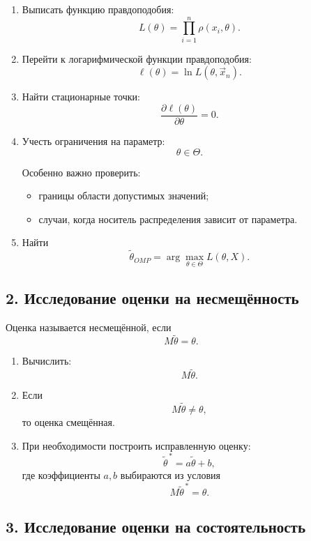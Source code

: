 \documentclass{article}
\begin{document}
\begin{enumerate}
    \item Выписать функцию правдоподобия:
    \[
    L(\theta)=\prod_{i=1}^n \rho(x_i, \theta).
    \]

    \item Перейти к логарифмической функции правдоподобия:
    \[
    \ell(\theta)=\ln L(\theta,\vec{x}_n).
    \]

    \item Найти стационарные точки:
    \[
    \frac{\partial \ell(\theta)}{\partial \theta}=0.
    \]

    \item Учесть ограничения на параметр:
    \[
    \theta \in \Theta.
    \]

    Особенно важно проверить:
    \begin{itemize}
        \item границы области допустимых значений;
        \item случаи, когда носитель распределения зависит от параметра.
    \end{itemize}

    \item Найти
    \[
    \widetilde{\theta}_{OMP}
    =
    \arg\max_{\theta \in \Theta} L(\theta,X).
    \]
\end{enumerate}

\subsection*{2. Исследование оценки на несмещённость}

Оценка называется несмещённой, если
\[
M\widetilde{\theta}=\theta.
\]

\begin{enumerate}
    \item Вычислить:
    \[
    M \widetilde{\theta}.
    \]

    \item Если
    \[
    M \widetilde{\theta}\neq \theta,
    \]
    то оценка смещённая.

    \item При необходимости построить исправленную оценку:
    \[
    \widetilde{\theta}^{\,*}=a\widetilde{\theta}+b,
    \]
    где коэффициенты \(a,b\) выбираются из условия
    \[
    M\widetilde{\theta}^{\,*}=\theta.
    \]
\end{enumerate}

\subsection*{3. Исследование оценки на состоятельность}
\end{document}
